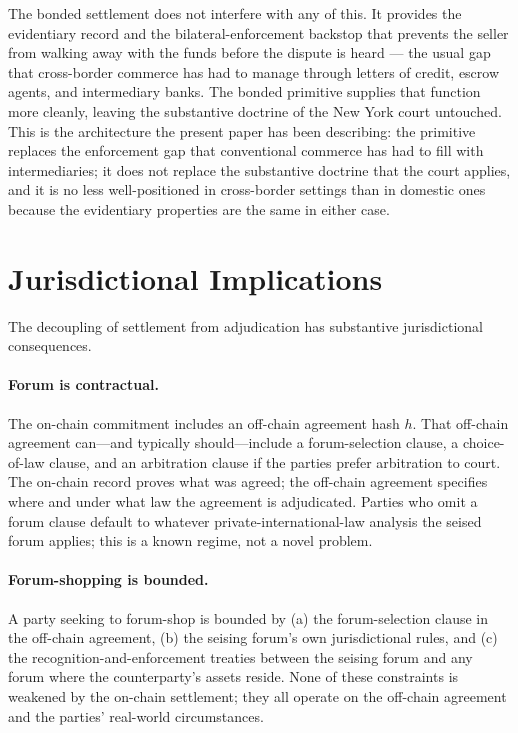 \documentclass[11pt,a4paper]{article}
\theoremstyle{remark}
\begin{document}
The bonded settlement does not interfere with any of this. It
provides the evidentiary record and the bilateral-enforcement
backstop that prevents the seller from walking away with the
funds before the dispute is heard --- the usual gap that
cross-border commerce has had to manage through letters of
credit, escrow agents, and intermediary banks. The bonded
primitive supplies that function more cleanly, leaving the
substantive doctrine of the New York court untouched. This is
the architecture the present paper has been describing: the
primitive replaces the enforcement gap that conventional
commerce has had to fill with intermediaries; it does not
replace the substantive doctrine that the court applies, and it
is no less well-positioned in cross-border settings than in
domestic ones because the evidentiary properties are the same
in either case.

\section{Jurisdictional Implications}
\label{sec:jurisdiction}

The decoupling of settlement from adjudication has substantive
jurisdictional consequences.

\paragraph{Forum is contractual.}
The on-chain commitment includes an off-chain agreement hash $h$.
That off-chain agreement can---and typically should---include a
forum-selection clause, a choice-of-law clause, and an
arbitration clause if the parties prefer arbitration to court.
The on-chain record proves what was agreed; the off-chain
agreement specifies where and under what law the agreement is
adjudicated. Parties who omit a forum clause default to whatever
private-international-law analysis the seised forum applies; this
is a known regime, not a novel problem.

\paragraph{Forum-shopping is bounded.}
A party seeking to forum-shop is bounded by (a) the
forum-selection clause in the off-chain agreement, (b) the seising
forum's own jurisdictional rules, and (c) the recognition-and-enforcement
treaties between the seising forum and any forum where the
counterparty's assets reside. None of these constraints is
weakened by the on-chain settlement; they all operate on the
off-chain agreement and the parties' real-world circumstances.
\end{document}
